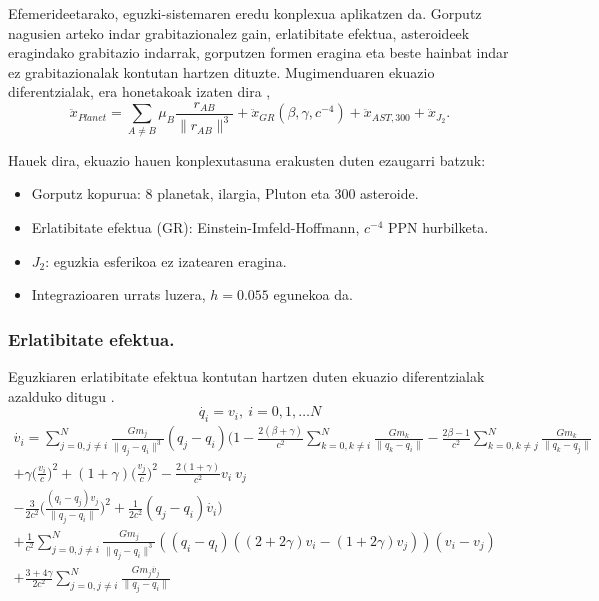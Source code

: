 Efemerideetarako, eguzki-sistemaren eredu konplexua aplikatzen da. Gorputz nagusien arteko indar grabitazionalez gain, erlatibitate efektua, asteroideek eragindako grabitazio indarrak, gorputzen formen eragina eta beste hainbat indar ez grabitazionalak kontutan hartzen dituzte. Mugimenduaren ekuazio diferentzialak, era honetakoak izaten dira \cite{Feinga2015},      
      \begin{equation*}
      \ddot{x}_{Planet}= \sum_{A \neq B} \mu_B \frac{r_{AB}}{\|r_{AB}\|^3}+\ddot{x}_{GR} (\beta,\gamma,c^{-4})+ \ddot{x}_{AST,300}+ \ddot{x}_{J_2}.
      \end{equation*}

Hauek dira, ekuazio hauen konplexutasuna erakusten duten ezaugarri batzuk:      
      \begin{itemize}
      \item Gorputz kopurua: $8$ planetak, ilargia, Pluton eta 300 asteroide.
      \item Erlatibitate efektua (GR): Einstein-Imfeld-Hoffmann, $c^{-4}$ PPN hurbilketa.
      \item $J_2$: eguzkia esferikoa ez izatearen eragina. 
      \item Integrazioaren urrats luzera, $h=0.055$ egunekoa da.
      \end{itemize}   

\subsubsection*{Erlatibitate efektua.}
Eguzkiaren erlatibitate efektua kontutan hartzen duten ekuazio diferentzialak azalduko ditugu \cite{Kopeikin2011}.
\begin{equation}
\dot{q_i}=v_i, \  i=0,1,\dots N
\end{equation}
\begin{multline} 
\dot{v_i}= \sum_{j=0,j \neq i}^{N} \frac{Gm_j}{\|q_j-q_i\|^3} (q_j-q_i)
           \bigg(1- \frac{2(\beta+\gamma)}{c^2} \sum\limits_{k=0, k \neq i}^{N} \frac{Gm_k}{\|q_k-q_i\|} 
                  - \frac{2\beta-1}{c^2}        \sum\limits_{k=0, k \neq j}^{N} \frac{Gm_k}{\|q_k-q_j\|} \\
                  + \gamma \big(\frac{v_i}{c}\big)^2 + (1+\gamma) \big(\frac{v_j}{c} \big)^2 
                  - \frac{2(1+\gamma)}{c^2} v_i \ v_j \\
                  - \frac{3}{2c^2} \big(\frac{(q_i-q_j) v_j}{\|q_j-q_i\|} \big)^2+                  
                  \frac{1}{2c^2}(q_j-q_i) \dot{v_i} \bigg) \\
           + \frac{1}{c^2} \sum_{j=0,j \neq i}^{N} \frac{Gm_j}{\|q_j-q_i\|^3} 
             ((q_i-q_l) ((2+2\gamma)v_i-(1+2\gamma)v_j)) (v_i-v_j) \\
           + \frac{3+4\gamma}{2c^2} \sum_{j=0,j \neq i}^{N} \frac{Gm_j \dot{v_j}}{\|q_j-q_i\|}                                      
\end{multline}

